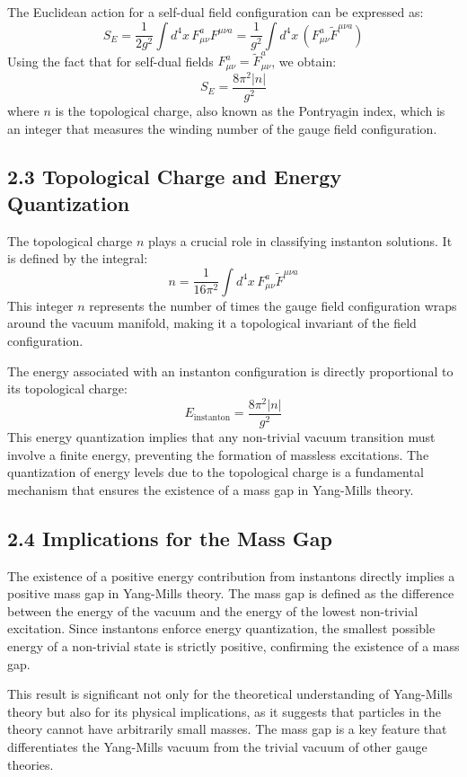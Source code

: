 \documentclass{article}
\begin{document}
The Euclidean action for a self-dual field configuration can be expressed as:
\[
S_E = \frac{1}{2g^2} \int d^4x \, F_{\mu\nu}^a F^{\mu\nu a} = \frac{1}{g^2} \int d^4x \, \left(F_{\mu\nu}^a \tilde{F}^{\mu\nu a}\right)
\]
Using the fact that for self-dual fields \( F_{\mu\nu}^a = \tilde{F}_{\mu\nu}^a \), we obtain:
\[
S_E = \frac{8\pi^2 |n|}{g^2}
\]
where \( n \) is the topological charge, also known as the Pontryagin index, which is an integer that measures the winding number of the gauge field configuration.

\subsection*{2.3 Topological Charge and Energy Quantization}
The topological charge \( n \) plays a crucial role in classifying instanton solutions. It is defined by the integral:
\[
n = \frac{1}{16\pi^2} \int d^4x \, F_{\mu\nu}^a \tilde{F}^{\mu\nu a}
\]
This integer \( n \) represents the number of times the gauge field configuration wraps around the vacuum manifold, making it a topological invariant of the field configuration.

The energy associated with an instanton configuration is directly proportional to its topological charge:
\[
E_{\text{instanton}} = \frac{8\pi^2 |n|}{g^2}
\]
This energy quantization implies that any non-trivial vacuum transition must involve a finite energy, preventing the formation of massless excitations. The quantization of energy levels due to the topological charge is a fundamental mechanism that ensures the existence of a mass gap in Yang-Mills theory.

\subsection*{2.4 Implications for the Mass Gap}
The existence of a positive energy contribution from instantons directly implies a positive mass gap in Yang-Mills theory. The mass gap is defined as the difference between the energy of the vacuum and the energy of the lowest non-trivial excitation. Since instantons enforce energy quantization, the smallest possible energy of a non-trivial state is strictly positive, confirming the existence of a mass gap.

This result is significant not only for the theoretical understanding of Yang-Mills theory but also for its physical implications, as it suggests that particles in the theory cannot have arbitrarily small masses. The mass gap is a key feature that differentiates the Yang-Mills vacuum from the trivial vacuum of other gauge theories.
\end{document}
